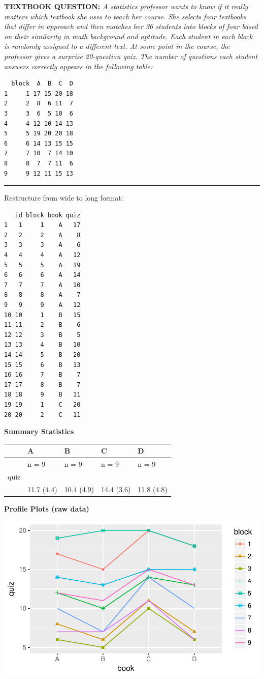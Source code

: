 \documentclass[]{article}
\begin{document}
\textbf{TEXTBOOK QUESTION:} \emph{A statistics professor wants to know
if it really matters which textbook she uses to teach her course. She
selects four textbooks that differ in approach and then matches her 36
students into blocks of four based on their similarity in math
background and aptitude. Each student in each block is randomly assigned
to a different text. At some point in the course, the professor gives a
surprise 20-question quiz. The number of questions each student answers
correctly appears in the following table:}

\begin{verbatim}
  block  A  B  C  D
1     1 17 15 20 18
2     2  8  6 11  7
3     3  6  5 10  6
4     4 12 10 14 13
5     5 19 20 20 18
6     6 14 13 15 15
7     7 10  7 14 10
8     8  7  7 11  6
9     9 12 11 15 13
\end{verbatim}

\begin{center}\rule{0.5\linewidth}{\linethickness}\end{center}

Restructure from wide to long format:

\begin{verbatim}
   id block book quiz
1   1     1    A   17
2   2     2    A    8
3   3     3    A    6
4   4     4    A   12
5   5     5    A   19
6   6     6    A   14
7   7     7    A   10
8   8     8    A    7
9   9     9    A   12
10 10     1    B   15
11 11     2    B    6
12 12     3    B    5
13 13     4    B   10
14 14     5    B   20
15 15     6    B   13
16 16     7    B    7
17 17     8    B    7
18 18     9    B   11
19 19     1    C   20
20 20     2    C   11
\end{verbatim}

\clearpage

\textbf{Summary Statistics}

\begin{longtable}[]{@{}lllll@{}}
\toprule
& A & B & C & D\tabularnewline
\midrule
\endhead
& n = 9 & n = 9 & n = 9 & n = 9\tabularnewline
quiz & & & &\tabularnewline
& 11.7 (4.4) & 10.4 (4.9) & 14.4 (3.6) & 11.8 (4.8)\tabularnewline
\bottomrule
\end{longtable}

\textbf{Profile Plots (raw data)}

\begin{center}\includegraphics{Unit_5_assignment_SKELETON_R__spr18__files/figure-latex/unnamed-chunk-13-1} \end{center}
\end{document}
